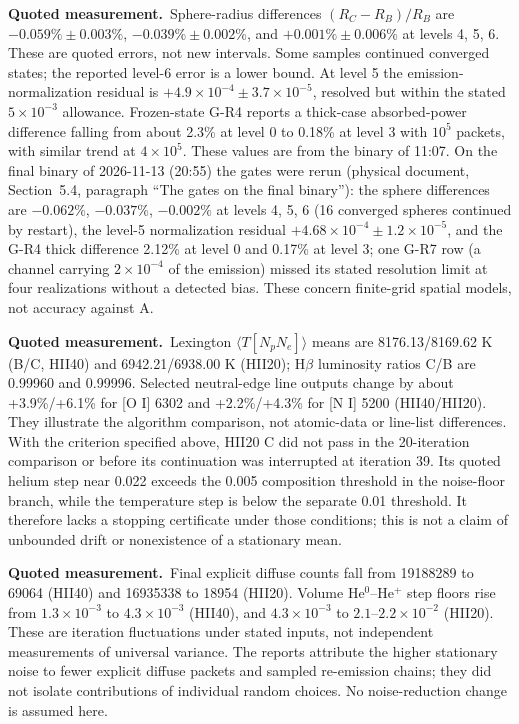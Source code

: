\documentclass[english,a4paper]{my_memo}
\newcommand{\Measured}{\noindent\textbf{Quoted measurement.}\ }
\begin{document}
\Measured Sphere-radius differences $(R_C-R_B)/R_B$ are
$-0.059\%\pm0.003\%$, $-0.039\%\pm0.002\%$, and
$+0.001\%\pm0.006\%$ at levels 4, 5, 6. These are quoted errors, not
new intervals. Some samples continued converged states; the reported
level-6 error is a lower bound. At level 5 the emission-normalization
residual is $+4.9\times10^{-4}\pm3.7\times10^{-5}$, resolved but within
the stated $5\times10^{-3}$ allowance. Frozen-state G-R4 reports a thick-case
absorbed-power difference falling from about 2.3\% at level 0 to 0.18\%
at level 3 with $10^5$ packets, with similar trend at $4\times10^5$.
These values are from the binary of 11:07. On the final binary of
2026-11-13 (20:55) the gates were rerun (physical document, Section~5.4, paragraph ``The gates on the final
binary''): the
sphere differences are $-0.062\%$, $-0.037\%$, $-0.002\%$ at levels 4, 5,
6 (16 converged spheres continued by restart), the level-5
normalization residual $+4.68\times10^{-4}\pm1.2\times10^{-5}$, and the
G-R4 thick difference 2.12\% at level 0 and 0.17\% at level 3; one G-R7
row (a channel carrying $2\times10^{-4}$ of the emission) missed its
stated resolution limit at four realizations without a detected bias.
These concern finite-grid spatial models, not accuracy against A.

\Measured Lexington $\langle T[N_pN_e]\rangle$ means are 8176.13/8169.62 K (B/C, HII40)
and 6942.21/6938.00 K (HII20); H$\beta$ luminosity ratios C/B are
0.99960 and 0.99996. Selected neutral-edge line outputs change by about
+3.9\%/+6.1\% for [O I] 6302 and +2.2\%/+4.3\% for [N I] 5200
(HII40/HII20). They illustrate the algorithm comparison, not atomic-data
or line-list differences. With the criterion specified above, HII20 C did not pass in the
20-iteration comparison or before its continuation was interrupted at
iteration 39. Its quoted helium step near 0.022 exceeds the 0.005
composition threshold in the noise-floor branch, while the temperature
step is below the separate 0.01 threshold. It therefore lacks a stopping
certificate under those conditions; this is not a claim of unbounded
drift or nonexistence of a stationary mean.

\Measured Final explicit diffuse counts fall from 19188289 to 69064
(HII40) and 16935338 to 18954 (HII20). Volume He$^0$--He$^+$ step floors
rise from $1.3\times10^{-3}$ to $4.3\times10^{-3}$ (HII40), and
$4.3\times10^{-3}$ to $2.1$--$2.2\times10^{-2}$ (HII20). These are
iteration fluctuations under stated inputs, not independent measurements
of universal variance. The reports attribute the higher stationary noise
to fewer explicit diffuse packets and sampled re-emission chains; they
did not isolate contributions of individual random choices. No
noise-reduction change is assumed here.
\end{document}
